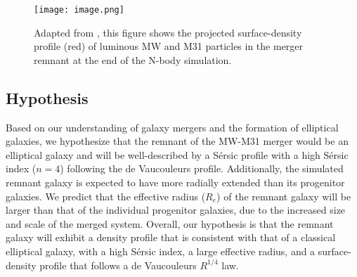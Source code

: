 \documentclass[linenumbers,trackchanges]{aastex7}
\begin{document}
\begin{figure}[h!]
    \centering
    \texttt{[image: image.png]}
    \caption{Adapted from \cite{vandermarelM31VELOCITYVECTOR2012}, this figure shows the projected surface-density profile (red) of luminous MW and M31 particles in the merger remnant at the end of the N-body simulation.}
    \label{fig:surface-dens-profile}
\end{figure}

\subsection{Hypothesis}
Based on our understanding of galaxy mergers and the formation of elliptical galaxies, we hypothesize that the remnant of the MW-M31 merger would be an elliptical galaxy and will be well-described by a Sérsic profile with a high Sérsic index ($n = 4$) following the de Vaucouleurs profile. Additionally, the simulated remnant galaxy is expected to have  more radially extended than its progenitor galaxies. We predict that the effective radius ($R_e$) of the remnant galaxy will be larger than that of the individual progenitor galaxies, due to the increased size and scale of the merged system. Overall, our hypothesis is that the remnant galaxy will exhibit a density profile that is consistent with that of a classical elliptical galaxy, with a high Sérsic index, a large effective radius, and a surface-density profile that follows a de Vaucouleurs $R^{1/4}$ law.



{}



\end{document}
